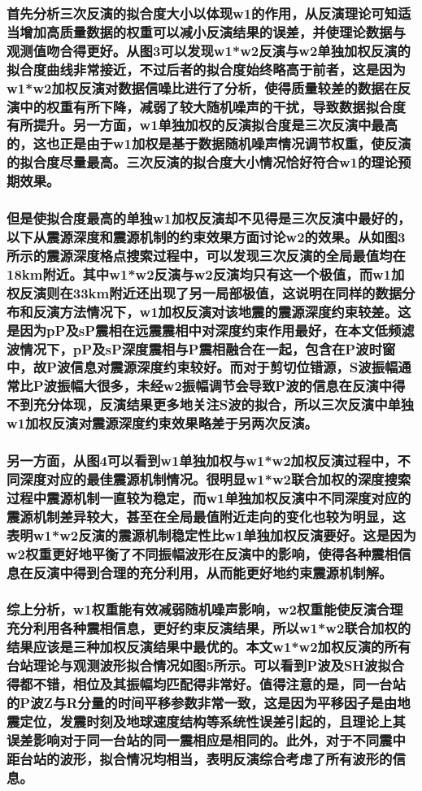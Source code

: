 \documentclass[a4paper,12pt,single,pdftex]{scrartcl}
\begin{document}
\label{ID_78066170}\subsubsection{首先分析三次反演的拟合度大小以体现w1的作用，从反演理论可知适当增加高质量数据的权重可以减小反演结果的误差，并使理论数据与观测值吻合得更好。从图3可以发现w1*w2反演与w2单独加权反演的拟合度曲线非常接近，不过后者的拟合度始终略高于前者，这是因为w1*w2加权反演对数据信噪比进行了分析，使得质量较差的数据在反演中的权重有所下降，减弱了较大随机噪声的干扰，导致数据拟合度有所提升。另一方面，w1单独加权的反演拟合度是三次反演中最高的，这也正是由于w1加权是基于数据随机噪声情况调节权重，使反演的拟合度尽量最高。三次反演的拟合度大小情况恰好符合w1的理论预期效果。}

\label{ID_1122523796}\subsubsection{但是使拟合度最高的单独w1加权反演却不见得是三次反演中最好的，以下从震源深度和震源机制的约束效果方面讨论w2的效果。从如图3所示的震源深度格点搜索过程中，可以发现三次反演的全局最值均在18km附近。其中w1*w2反演与w2反演均只有这一个极值，而w1加权反演则在33km附近还出现了另一局部极值，这说明在同样的数据分布和反演方法情况下，w1加权反演对该地震的震源深度约束较差。这是因为pP及sP震相在远震震相中对深度约束作用最好，在本文低频滤波情况下，pP及sP深度震相与P震相融合在一起，包含在P波时窗中，故P波信息对震源深度约束较好。而对于剪切位错源，S波振幅通常比P波振幅大很多，未经w2振幅调节会导致P波的信息在反演中得不到充分体现，反演结果更多地关注S波的拟合，所以三次反演中单独w1加权反演对震源深度约束效果略差于另两次反演。}

\label{ID_366051100}\subsubsection{另一方面，从图4可以看到w1单独加权与w1*w2加权反演过程中，不同深度对应的最佳震源机制情况。很明显w1*w2联合加权的深度搜索过程中震源机制一直较为稳定，而w1单独加权反演中不同深度对应的震源机制差异较大，甚至在全局最值附近走向的变化也较为明显，这表明w1*w2反演的震源机制稳定性比w1单独加权反演要好。这是因为w2权重更好地平衡了不同振幅波形在反演中的影响，使得各种震相信息在反演中得到合理的充分利用，从而能更好地约束震源机制解。}

\label{ID_1371023412}\subsubsection{综上分析，w1权重能有效减弱随机噪声影响，w2权重能使反演合理充分利用各种震相信息，更好约束反演结果，所以w1*w2联合加权的结果应该是三种加权反演结果中最优的。本文w1*w2加权反演的所有台站理论与观测波形拟合情况如图5所示。可以看到P波及SH波拟合得都不错，相位及其振幅均匹配得非常好。值得注意的是，同一台站的P波Z与R分量的时间平移参数非常一致，这是因为平移因子是由地震定位，发震时刻及地球速度结构等系统性误差引起的，且理论上其误差影响对于同一台站的同一震相应是相同的。此外，对于不同震中距台站的波形，拟合情况均相当，表明反演综合考虑了所有波形的信息。}
\end{document}
